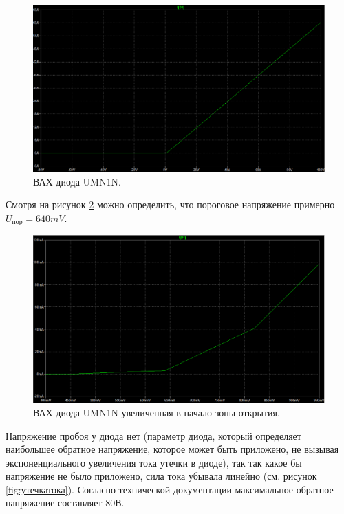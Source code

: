 \begin{figure}[htbp]
    \centering
    \includegraphics[width=1\linewidth]{figs/ВАХ_UMN1N.png}
    \caption{ВАХ диода UMN1N.}
    \label{fig:вах}
\end{figure}

Смотря на рисунок \ref{fig:вахzoomed} можно определить, что пороговое напряжение примерно $U_\text{пор}=640mV$.

\begin{figure}[htbp]
    \centering
    \includegraphics[width=1\linewidth]{figs/zoomed_ВАХ_UMN1N.png}
    \caption{ВАХ диода UMN1N увеличенная в начало зоны открытия.}
    \label{fig:вахzoomed}
\end{figure}

Напряжение пробоя у диода нет (параметр диода, который определяет наибольшее обратное напряжение, 
которое может быть приложено, не вызывая экспоненциального увеличения тока утечки в диоде),
так так какое бы напряжение не было приложено, сила тока убывала линейно (см. рисунок
\ref{fig:утечкатока}). Согласно технической документации максимальное обратное напряжение
составляет $80\text{В}$. 

